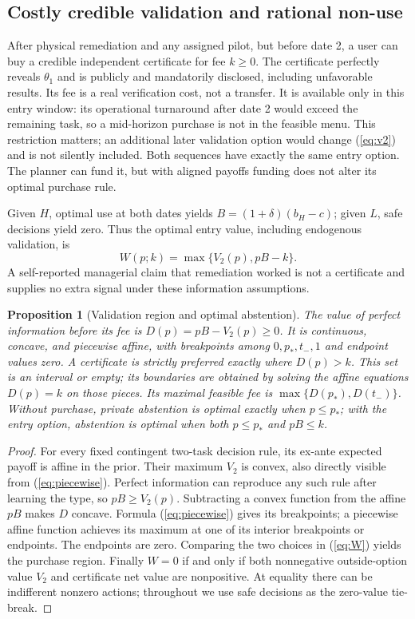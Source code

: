 \documentclass[11pt]{article}
\newtheorem{proposition}{Proposition}
\begin{document}
\subsection{Costly credible validation and rational non-use}\label{sec:certificate}
After physical remediation and any assigned pilot, but before date 2, a user can buy a credible independent certificate for fee $k\geq0$. The certificate perfectly reveals $\theta_1$ and is publicly and mandatorily disclosed, including unfavorable results. Its fee is a real verification cost, not a transfer. It is available only in this entry window: its operational turnaround after date 2 would exceed the remaining task, so a mid-horizon purchase is not in the feasible menu. This restriction matters; an additional later validation option would change (\ref{eq:v2}) and is not silently included. Both sequences have exactly the same entry option. The planner can fund it, but with aligned payoffs funding does not alter its optimal purchase rule.

Given $H$, optimal use at both dates yields $B=(1+\delta)(b_H-c)$; given $L$, safe decisions yield zero. Thus the optimal entry value, including endogenous validation, is
\begin{equation}
 W(p;k)=\max\{V_2(p),pB-k\}.\label{eq:W}
\end{equation}
A self-reported managerial claim that remediation worked is not a certificate and supplies no extra signal under these information assumptions.

\begin{proposition}[Validation region and optimal abstention]\label{prop:validate}
The value of perfect information before its fee is $D(p)=pB-V_2(p)\geq0$. It is continuous, concave, and piecewise affine, with breakpoints among $0,p_*,t_-,1$ and endpoint values zero. A certificate is strictly preferred exactly where $D(p)>k$. This set is an interval or empty; its boundaries are obtained by solving the affine equations $D(p)=k$ on those pieces. Its maximal feasible fee is $\max\{D(p_*),D(t_-)\}$. Without purchase, private abstention is optimal exactly when $p\leq p_*$; with the entry option, abstention is optimal when both $p\leq p_*$ and $pB\leq k$.
\end{proposition}
\begin{proof}
For every fixed contingent two-task decision rule, its ex-ante expected payoff is affine in the prior. Their maximum $V_2$ is convex, also directly visible from (\ref{eq:piecewise}). Perfect information can reproduce any such rule after learning the type, so $pB\geq V_2(p)$. Subtracting a convex function from the affine $pB$ makes $D$ concave. Formula (\ref{eq:piecewise}) gives its breakpoints; a piecewise affine function achieves its maximum at one of its interior breakpoints or endpoints. The endpoints are zero. Comparing the two choices in (\ref{eq:W}) yields the purchase region. Finally $W=0$ if and only if both nonnegative outside-option value $V_2$ and certificate net value are nonpositive. At equality there can be indifferent nonzero actions; throughout we use safe decisions as the zero-value tie-break.
\end{proof}
\end{document}
